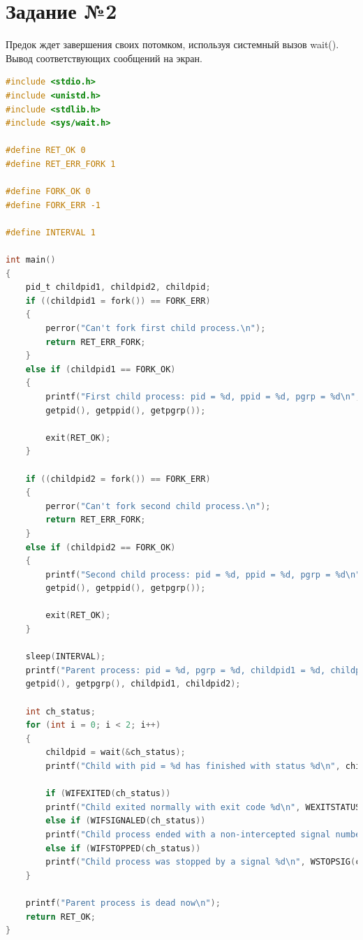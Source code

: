 \documentclass[12pt]{report}
\begin{document}
\section*{Задание №2}

Предок ждет завершения своих потомком, используя системный вызов wait(). Вывод соответствующих сообщений на экран.

\begin{lstlisting}[label=some-code,caption=Код программы к заданию №2,language=C]
#include <stdio.h>
#include <unistd.h>
#include <stdlib.h>
#include <sys/wait.h>

#define RET_OK 0
#define RET_ERR_FORK 1

#define FORK_OK 0
#define FORK_ERR -1

#define INTERVAL 1

int main()
{
	pid_t childpid1, childpid2, childpid;
	if ((childpid1 = fork()) == FORK_ERR)
	{
		perror("Can't fork first child process.\n");
		return RET_ERR_FORK;
	}
	else if (childpid1 == FORK_OK)
	{
		printf("First child process: pid = %d, ppid = %d, pgrp = %d\n", 
		getpid(), getppid(), getpgrp());
		
		exit(RET_OK);
	}
	
	if ((childpid2 = fork()) == FORK_ERR)
	{
		perror("Can't fork second child process.\n");
		return RET_ERR_FORK;
	}
	else if (childpid2 == FORK_OK)
	{
		printf("Second child process: pid = %d, ppid = %d, pgrp = %d\n", 
		getpid(), getppid(), getpgrp());
		
		exit(RET_OK);
	}
	
	sleep(INTERVAL);
	printf("Parent process: pid = %d, pgrp = %d, childpid1 = %d, childpid2 = %d\n", 
	getpid(), getpgrp(), childpid1, childpid2);
	
	int ch_status;
	for (int i = 0; i < 2; i++)
	{
		childpid = wait(&ch_status);
		printf("Child with pid = %d has finished with status %d\n", childpid, ch_status);
		
		if (WIFEXITED(ch_status))
		printf("Child exited normally with exit code %d\n", WEXITSTATUS(ch_status));
		else if (WIFSIGNALED(ch_status))
		printf("Child process ended with a non-intercepted signal number %d\n", WTERMSIG(ch_status));
		else if (WIFSTOPPED(ch_status))
		printf("Child process was stopped by a signal %d\n", WSTOPSIG(ch_status));
	}
	
	printf("Parent process is dead now\n");
	return RET_OK;
}
\end{lstlisting}
\end{document}
